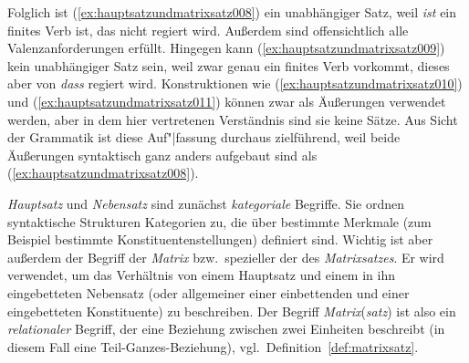 
Folglich ist (\ref{ex:hauptsatzundmatrixsatz008}) ein unabhängiger Satz, weil \textit{ist} ein finites Verb ist, das nicht regiert wird.
Außerdem sind offensichtlich alle Valenzanforderungen erfüllt.
Hingegen kann (\ref{ex:hauptsatzundmatrixsatz009}) kein unabhängiger Satz sein, weil zwar genau ein finites Verb vorkommt, dieses aber von \textit{dass} regiert wird.
Konstruktionen wie (\ref{ex:hauptsatzundmatrixsatz010}) und (\ref{ex:hauptsatzundmatrixsatz011}) können zwar als Äußerungen verwendet werden, aber in dem hier vertretenen Verständnis sind sie keine Sätze.
Aus Sicht der Grammatik ist diese Auf"|fassung durchaus zielführend, weil beide Äußerungen syntaktisch ganz anders aufgebaut sind als (\ref{ex:hauptsatzundmatrixsatz008}).

\begin{exe}
  \ex\label{ex:hauptsatzundmatrixsatz007}
  \begin{xlist}
  \end{xlist}
\end{exe}

\textit{Hauptsatz} und \textit{Nebensatz} sind zunächst \textit{kategoriale} Begriffe.
Sie ordnen syntaktische Strukturen Kategorien zu, die über bestimmte Merkmale (zum Beispiel bestimmte Konstituentenstellungen) definiert sind.
Wichtig ist aber außerdem der Begriff der \textit{Matrix} bzw.\ spezieller der des \textit{Matrixsatzes}.
Er wird verwendet, um das Verhältnis von einem Hauptsatz und einem in ihn eingebetteten Nebensatz (oder allgemeiner einer einbettenden und einer eingebetteten Konstituente) zu beschreiben.
Der Begriff \textit{Matrix}(\textit{satz}) ist also ein \textit{relationaler} Begriff, der eine Beziehung zwischen zwei Einheiten beschreibt (in diesem Fall eine Teil-Ganzes-Beziehung), vgl.\ Definition~\ref{def:matrixsatz}.


